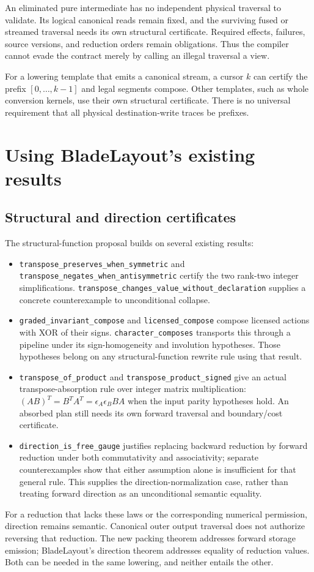 \documentclass[11pt]{article}
\begin{document}
An eliminated pure intermediate has no independent physical traversal to
validate. Its logical canonical reads remain fixed, and the surviving fused
or streamed traversal needs its own structural certificate. Required effects,
failures, source versions, and reduction orders remain obligations. Thus the
compiler cannot evade the contract merely by calling an illegal traversal a
view.

For a lowering template that emits a canonical stream, a cursor $k$ can certify
the prefix $[0,\ldots,k-1]$ and legal segments compose. Other templates, such as
whole conversion kernels, use their own structural certificate. There is no
universal requirement that all physical destination-write traces be prefixes.

\section{Using BladeLayout's existing results}
\subsection{Structural and direction certificates}
The structural-function proposal builds on several existing results:
\begin{itemize}
\item \texttt{transpose\_preserves\_when\_symmetric} and
\texttt{transpose\_negates\_when\_antisymmetric} certify the two rank-two integer simplifications. \texttt{transpose\_changes\_value\_without\_declaration} supplies a concrete counterexample to unconditional collapse.
\item \texttt{graded\_invariant\_compose} and \texttt{licensed\_compose} compose licensed actions with XOR of their signs. \texttt{character\_composes} transports this through a pipeline under its sign-homogeneity and involution hypotheses. Those hypotheses belong on any structural-function rewrite rule using that result.
\item \texttt{transpose\_of\_product} and \texttt{transpose\_product\_signed} give an actual transpose-absorption rule over integer matrix multiplication:
$(AB)^T=B^TA^T=\epsilon_A\epsilon_B BA$ when the input parity hypotheses hold. An absorbed plan still needs its own forward traversal and boundary/cost certificate.
\item \texttt{direction\_is\_free\_gauge} justifies replacing backward reduction by forward reduction under both commutativity and associativity; separate counterexamples show that either assumption alone is insufficient for that general rule. This supplies the direction-normalization case, rather than treating forward direction as an unconditional semantic equality.
\end{itemize}
For a reduction that lacks these laws or the corresponding numerical permission, direction remains semantic. Canonical outer output traversal does not authorize reversing that reduction. The new packing theorem addresses forward storage emission; BladeLayout's direction theorem addresses equality of reduction values. Both can be needed in the same lowering, and neither entails the other.
\end{document}
